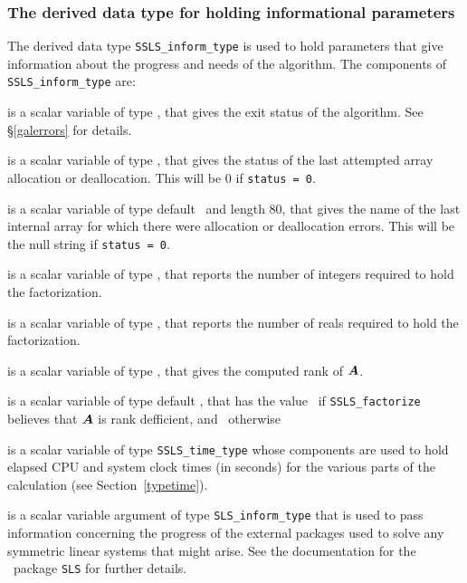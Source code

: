 \documentclass{galahad}
\newcommand{\packagename}{SSLS}
\begin{document}

\subsubsection{The derived data type for holding informational
 parameters}\label{typeinform}
The derived data type
{\tt \packagename\_inform\_type}
is used to hold parameters that give information about the progress and needs
of the algorithm. The components of
{\tt \packagename\_inform\_type}
are:

\begin{description}

 is a scalar variable of type \integer, that gives the
exit status of the algorithm.
See \S\ref{galerrors}
for details.

 is a scalar variable of type \integer, that gives
the status of the last attempted array allocation or deallocation.
This will be 0 if {\tt status = 0}.

 is a scalar variable of type default \character\
and length 80, that  gives the name of the last internal array
for which there were allocation or deallocation errors.
This will be the null string if {\tt status = 0}.

 is a scalar variable of type \longinteger,
that reports the number of integers required to hold the factorization.

 is a scalar variable of type \longinteger,
that reports the number of reals required to hold the factorization.

 is a scalar variable of type \integer, that gives the
computed rank of ${\bm{A}}$.

 is a scalar variable of type default \logical, that has the
value \true\ if {\tt \packagename\_factorize} believes that
${\bm{A}}$ is rank defficient, and \false\ otherwise

 is a scalar variable of type {\tt \packagename\_time\_type}
whose components are used to hold elapsed CPU and system clock times
(in seconds) for the various parts of the calculation
(see Section~\ref{typetime}).

 is a scalar variable argument of type
{\tt SLS\_inform\_type} that is used to pass information
concerning the progress of the external packages used to solve any symmetric
linear systems that might arise.
See the documentation for the \galahad\ package {\tt SLS} for further details.

\end{description}
\end{document}
